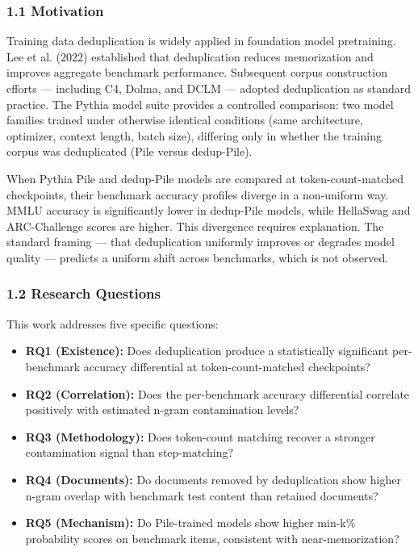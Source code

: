 
\subsubsection{1.1 Motivation}

Training data deduplication is widely applied in foundation model pretraining. Lee et al. (2022) established that deduplication reduces memorization and improves aggregate benchmark performance. Subsequent corpus construction efforts --- including C4, Dolma, and DCLM --- adopted deduplication as standard practice. The Pythia model suite \citep{Biderman2023Pythia} provides a controlled comparison: two model families trained under otherwise identical conditions (same architecture, optimizer, context length, batch size), differing only in whether the training corpus was deduplicated (Pile versus dedup-Pile).

When Pythia Pile and dedup-Pile models are compared at token-count-matched checkpoints, their benchmark accuracy profiles diverge in a non-uniform way. MMLU accuracy is significantly lower in dedup-Pile models, while HellaSwag and ARC-Challenge scores are higher. This divergence requires explanation. The standard framing --- that deduplication uniformly improves or degrades model quality --- predicts a uniform shift across benchmarks, which is not observed.

\subsubsection{1.2 Research Questions}

This work addresses five specific questions:

\begin{itemize}
\item \textbf{RQ1 (Existence):} Does deduplication produce a statistically significant per-benchmark accuracy differential at token-count-matched checkpoints?
\item \textbf{RQ2 (Correlation):} Does the per-benchmark accuracy differential correlate positively with estimated n-gram contamination levels?
\item \textbf{RQ3 (Methodology):} Does token-count matching recover a stronger contamination signal than step-matching?
\item \textbf{RQ4 (Documents):} Do documents removed by deduplication show higher n-gram overlap with benchmark test content than retained documents?
\item \textbf{RQ5 (Mechanism):} Do Pile-trained models show higher min-k\% probability scores on benchmark items, consistent with near-memorization?
\end{itemize}

